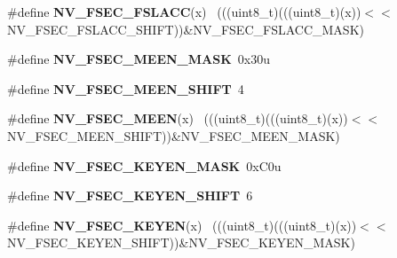 \begin{DoxyCompactItemize}
\item 
\hypertarget{group___n_v___register___masks_gae4a6264735dd8537ff6a3a993a8c50d8}{}\#define {\bfseries N\+V\+\_\+\+F\+S\+E\+C\+\_\+\+F\+S\+L\+A\+C\+C}(x)                                            ~(((uint8\+\_\+t)(((uint8\+\_\+t)(x))$<$$<$N\+V\+\_\+\+F\+S\+E\+C\+\_\+\+F\+S\+L\+A\+C\+C\+\_\+\+S\+H\+I\+F\+T))\&N\+V\+\_\+\+F\+S\+E\+C\+\_\+\+F\+S\+L\+A\+C\+C\+\_\+\+M\+A\+S\+K)\label{group___n_v___register___masks_gae4a6264735dd8537ff6a3a993a8c50d8}

\item 
\hypertarget{group___n_v___register___masks_ga02f5aa86e1f5bceefd0378fa736d5656}{}\#define {\bfseries N\+V\+\_\+\+F\+S\+E\+C\+\_\+\+M\+E\+E\+N\+\_\+\+M\+A\+S\+K}~0x30u\label{group___n_v___register___masks_ga02f5aa86e1f5bceefd0378fa736d5656}

\item 
\hypertarget{group___n_v___register___masks_ga13adfbdf46af9e59b446d17ce90b49c1}{}\#define {\bfseries N\+V\+\_\+\+F\+S\+E\+C\+\_\+\+M\+E\+E\+N\+\_\+\+S\+H\+I\+F\+T}~4\label{group___n_v___register___masks_ga13adfbdf46af9e59b446d17ce90b49c1}

\item 
\hypertarget{group___n_v___register___masks_gafb2cb85643ad7aa0997ed49baa90379f}{}\#define {\bfseries N\+V\+\_\+\+F\+S\+E\+C\+\_\+\+M\+E\+E\+N}(x)                                                ~(((uint8\+\_\+t)(((uint8\+\_\+t)(x))$<$$<$N\+V\+\_\+\+F\+S\+E\+C\+\_\+\+M\+E\+E\+N\+\_\+\+S\+H\+I\+F\+T))\&N\+V\+\_\+\+F\+S\+E\+C\+\_\+\+M\+E\+E\+N\+\_\+\+M\+A\+S\+K)\label{group___n_v___register___masks_gafb2cb85643ad7aa0997ed49baa90379f}

\item 
\hypertarget{group___n_v___register___masks_ga50a87e963eeaaf5fdb904e7bac9099af}{}\#define {\bfseries N\+V\+\_\+\+F\+S\+E\+C\+\_\+\+K\+E\+Y\+E\+N\+\_\+\+M\+A\+S\+K}~0x\+C0u\label{group___n_v___register___masks_ga50a87e963eeaaf5fdb904e7bac9099af}

\item 
\hypertarget{group___n_v___register___masks_ga3df55e24a4dc42a19afc15b4a3137bae}{}\#define {\bfseries N\+V\+\_\+\+F\+S\+E\+C\+\_\+\+K\+E\+Y\+E\+N\+\_\+\+S\+H\+I\+F\+T}~6\label{group___n_v___register___masks_ga3df55e24a4dc42a19afc15b4a3137bae}

\item 
\hypertarget{group___n_v___register___masks_ga36512e2f79f5136a62b0f32ad2955c25}{}\#define {\bfseries N\+V\+\_\+\+F\+S\+E\+C\+\_\+\+K\+E\+Y\+E\+N}(x)                                              ~(((uint8\+\_\+t)(((uint8\+\_\+t)(x))$<$$<$N\+V\+\_\+\+F\+S\+E\+C\+\_\+\+K\+E\+Y\+E\+N\+\_\+\+S\+H\+I\+F\+T))\&N\+V\+\_\+\+F\+S\+E\+C\+\_\+\+K\+E\+Y\+E\+N\+\_\+\+M\+A\+S\+K)\label{group___n_v___register___masks_ga36512e2f79f5136a62b0f32ad2955c25}


\end{DoxyCompactItemize}
